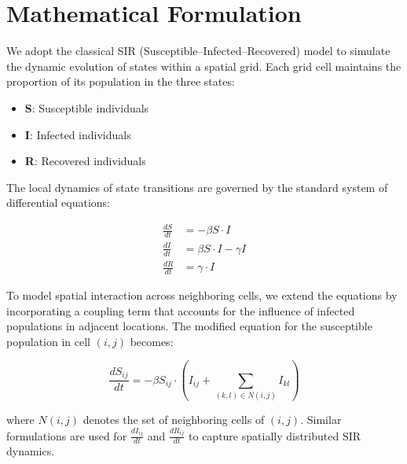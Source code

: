 \section{Mathematical Formulation}
We adopt the classical SIR (Susceptible–Infected–Recovered) model to simulate the dynamic evolution of states within a spatial grid. Each grid cell maintains the proportion of its population in the three states:

\begin{itemize}
    \item \textbf{S}: Susceptible individuals
    \item \textbf{I}: Infected individuals
    \item \textbf{R}: Recovered individuals
\end{itemize}

The local dynamics of state transitions are governed by the standard system of differential equations:

\begin{align*}
\frac{dS}{dt} &= -\beta S \cdot I \\
\frac{dI}{dt} &= \beta S \cdot I - \gamma I \\
\frac{dR}{dt} &= \gamma \cdot I
\end{align*}

To model spatial interaction across neighboring cells, we extend the equations by incorporating a coupling term that accounts for the influence of infected populations in adjacent locations. The modified equation for the susceptible population in cell \((i, j)\) becomes:

\[
\frac{dS_{ij}}{dt} = -\beta S_{ij} \cdot \left( I_{ij} + \sum_{(k,l) \in N(i,j)} I_{kl} \right)
\]

where \( N(i,j) \) denotes the set of neighboring cells of \((i,j)\). Similar formulations are used for \( \frac{dI_{ij}}{dt} \) and \( \frac{dR_{ij}}{dt} \) to capture spatially distributed SIR dynamics.
